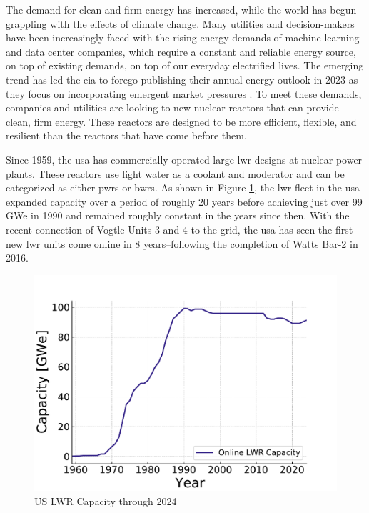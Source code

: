 The demand for clean and firm energy has increased, while the world has
begun grappling with the effects of climate change. Many utilities and
decision-makers have been increasingly faced with the rising energy demands of
machine learning and data center companies, which require a constant and
reliable energy source, on top of existing demands, on top of our everyday
electrified lives. The emerging trend has led the \gls{eia} to forego
publishing their annual energy outlook in 2023 as they focus on incorporating
emergent market pressures \cite{eia_annual_outlook_canceled_2023}. To meet
these demands, companies and utilities are looking to new nuclear reactors that
can provide clean, firm energy. These reactors are designed to be more
efficient, flexible, and resilient than the reactors that have come before them.

Since 1959, the \gls{usa} has commercially operated large \gls{lwr} designs at
nuclear power plants. These reactors use light water as a coolant and moderator
and can be categorized as either \glspl{pwr} or \glspl{bwr}. As shown in Figure
\ref{fig:online_lwr_cap_2024}, the \gls{lwr} fleet in the \gls{usa} expanded
capacity over a period of roughly 20 years before achieving just over 99 GWe in
1990 and remained roughly constant in the years since then. With the recent
connection of Vogtle Units 3 and 4 to the grid, the \gls{usa} has seen the
first new \gls{lwr} units come online in 8 years--following the completion of
Watts Bar-2 in 2016.

\begin{figure}[htbp]
    \centering
    \includegraphics[scale=0.8]{images/intro/online_lwr_cap_2024.pdf}
    \caption{US LWR Capacity through 2024 \cite{IAEA_PRIS}}
    \label{fig:online_lwr_cap_2024}
\end{figure}

